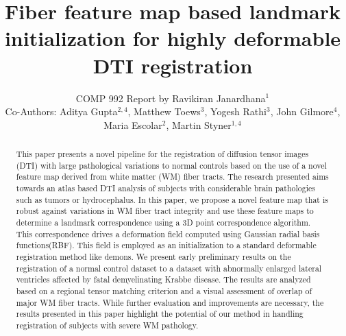 \documentclass{llncs}
\begin{document}
%
\frontmatter          %
%
\pagestyle{headings}  %
\mainmatter              %
%
\title{Fiber feature map based landmark initialization for highly deformable DTI registration}
\author{COMP 992 Report by Ravikiran Janardhana$^{1}$ \\ \vspace{2mm} Co-Authors: Aditya Gupta$^{2,4}$, Matthew Toews$^{3}$, Yogesh Rathi$^{3}$, John Gilmore$^{4}$, Maria Escolar$^{2}$, Martin Styner$^{1,4}$}



\maketitle              %


\begin{abstract}
This paper presents a novel pipeline for the registration of diffusion tensor images (DTI) with large pathological variations to normal controls based on the use of a novel feature map derived from white matter (WM) fiber tracts. The research presented aims towards an atlas based DTI analysis of subjects with considerable brain pathologies such as  tumors or hydrocephalus. In this paper, we propose a novel feature map that is robust against variations in WM fiber tract integrity and use these feature maps to determine a landmark correspondence using a 3D point correspondence algorithm. This correspondence drives a deformation field computed using Gaussian radial basis functions(RBF). This field is employed as an initialization to a standard deformable registration method like demons. We present early preliminary results on  the registration of a normal control dataset to a dataset with abnormally enlarged lateral ventricles affected by  fatal demyelinating Krabbe disease. The results are analyzed based on a regional tensor matching criterion and a visual assessment of overlap of major WM fiber tracts. While further evaluation and improvements are necessary, the results presented in this paper highlight the potential of our method in handling registration of subjects with severe WM pathology.

\end{abstract}
\end{document}
